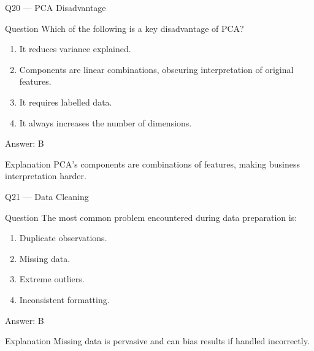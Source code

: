 \documentclass[aspectratio=169,8pt]{beamer}
\begin{document}
	\begin{frame}{Q20 --- PCA Disadvantage}
		\begin{block}{Question}
			Which of the following is a key disadvantage of PCA?
		\end{block}
		\begin{enumerate}
			\item It reduces variance explained.
			\item Components are linear combinations, obscuring interpretation of original features.
			\item It requires labelled data.
			\item It always increases the number of dimensions.
		\end{enumerate}
		\begin{exampleblock}{Answer: B}\end{exampleblock}
		\begin{block}{Explanation}
			PCA's components are combinations of features, making business interpretation harder.
		\end{block}
	\end{frame}
	
	\begin{frame}{Q21 --- Data Cleaning}
		\begin{block}{Question}
			The most common problem encountered during data preparation is:
		\end{block}
		\begin{enumerate}
			\item Duplicate observations.
			\item Missing data.
			\item Extreme outliers.
			\item Inconsistent formatting.
		\end{enumerate}
		\begin{exampleblock}{Answer: B}\end{exampleblock}
		\begin{block}{Explanation}
			Missing data is pervasive and can bias results if handled incorrectly.
		\end{block}
	\end{frame}
	
\end{document}
